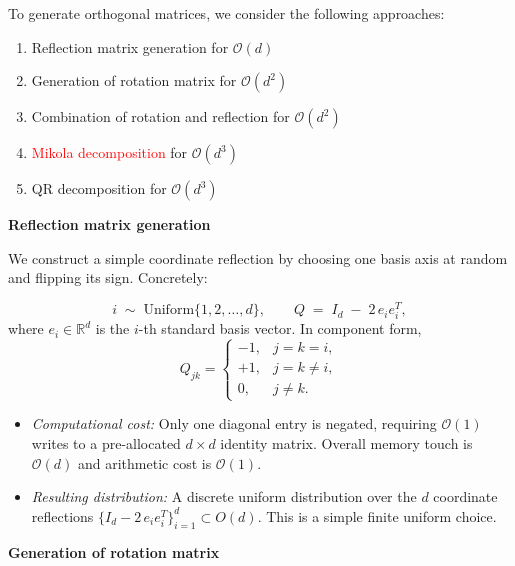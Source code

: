 \documentclass{article}
\theoremstyle{plain}
\theoremstyle{definition}
\theoremstyle{remark}
\begin{document}
To generate orthogonal matrices, we consider the following approaches:

\begin{enumerate}
    \item Reflection matrix generation for $\mathcal{O}(d)$

    \item Generation of rotation matrix for $\mathcal{O}(d^2)$

    \item Combination of rotation and reflection for $\mathcal{O}(d^2)$

    \item \textcolor{red}{Mikola decomposition} for $\mathcal{O}(d^3)$

    \item QR decomposition for $\mathcal{O}(d^3)$
\end{enumerate}

\textbf{Reflection matrix generation}

We construct a simple coordinate reflection by choosing one basis axis at random and flipping its sign. Concretely:

\begin{equation*}
  i \;\sim\;\mathrm{Uniform}\{1,2,\dots,d\}, 
  \qquad
  Q \;=\; I_d \;-\; 2\,e_i e_i^T,
\end{equation*}
where $e_i\in\mathbb R^d$ is the $i$-th standard basis vector.  In component form,
\begin{equation*}
  Q_{jk} = \begin{cases}
    -1, & j=k=i,\\
    +1, & j=k\neq i,\\
    0,  & j\neq k.
  \end{cases}
\end{equation*}

\begin{itemize}
  \item \emph{Computational cost:}  
    Only one diagonal entry is negated, requiring $\mathcal{O}(1)$ writes to a pre-allocated $d\times d$ identity matrix.  Overall memory touch is $\mathcal{O}(d)$ and arithmetic cost is $\mathcal{O}(1)$.
  \item \emph{Resulting distribution:}  
    A discrete uniform distribution over the $d$ coordinate reflections  
    $\{I_d - 2\,e_i e_i^T\}_{i=1}^d \subset O(d)$.  
    This is a simple finite uniform choice.
\end{itemize}

\textbf{Generation of rotation matrix}
\end{document}
